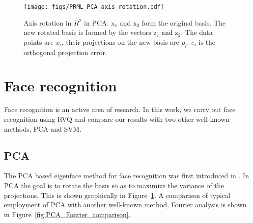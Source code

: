 \begin{Body}
\begin{figure}
\centering
\texttt{[image: figs/PRML\_PCA\_axis\_rotation.pdf]}
\caption{Axis rotation in $R^2$ in PCA.  $\mathrm{x}_1$ and $\mathrm{x}_2$ form the original basis.  The new rotated basis is formed by the vectors $\mathrm{z}_1$ and $\mathrm{z}_2$.  The data points are $x_i$, their projections on the new basis are $p_i$.  $e_i$ is the orthogonal projection error.}
\label{fig:PCA_axis_rotation}
\end{figure}

%
%
%
%



\section{Face recognition}
Face recognition is an active area of research.  In this work, we carry out face recognition using RVQ and compare our results with two other well-known methods, PCA and SVM.  

\subsection{PCA}
The PCA based eigenface method for face recognition was first introduced in \cite{1991_JNL_Eigenfaces_Turk}.  In PCA the goal is to rotate the basis so as to maximize the variance of the projections.  This is shown graphically in Figure~\ref{fig:PCA_axis_rotation}.  A comparison of typical employment of PCA with another well-known method, Fourier analysis is shown in Figure~\ref{fig:PCA_Fourier_comparison}.




\end{Body}
